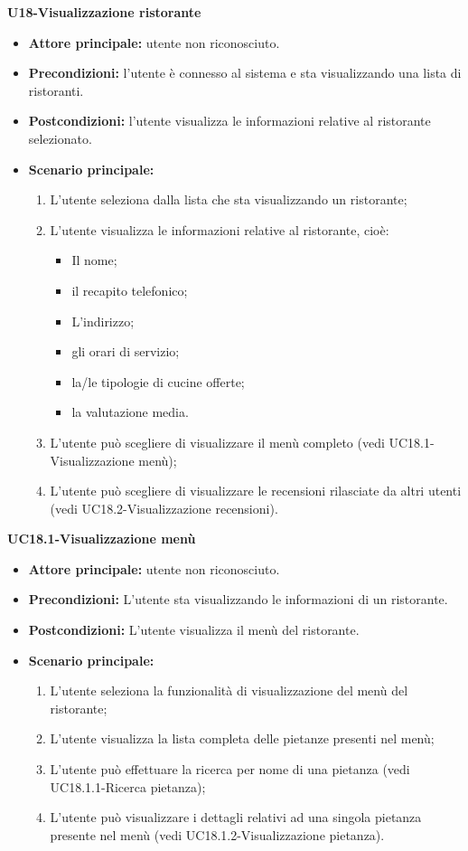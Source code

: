 \textbf{U18-Visualizzazione ristorante}
\begin{itemize}
\item \textbf{Attore principale:} utente non riconosciuto.
\item \textbf{Precondizioni:} l'utente è connesso al sistema e sta visualizzando una lista di ristoranti.
\item \textbf{Postcondizioni:} l'utente visualizza le informazioni relative al ristorante selezionato.
\item \textbf{Scenario principale:}
\begin{enumerate}
    \item L'utente seleziona dalla lista che sta visualizzando un ristorante;
    \item L'utente visualizza le informazioni relative al ristorante, cioè:
    \begin{itemize}
        \item Il nome;
        \item il recapito telefonico;
        \item L'indirizzo;
        \item gli orari di servizio;
        \item la/le tipologie di cucine offerte;
        \item la valutazione media.
    \end{itemize}
    \item L'utente può scegliere di visualizzare il menù completo (vedi UC18.1-Visualizzazione menù);
    \item L'utente può scegliere di visualizzare le recensioni rilasciate da altri utenti (vedi UC18.2-Visualizzazione recensioni).
\end{enumerate}
\end{itemize}

\textbf{UC18.1-Visualizzazione menù}
\begin{itemize}
\item \textbf{Attore principale:} utente non riconosciuto.
\item \textbf{Precondizioni:} L'utente sta visualizzando le informazioni di un ristorante.
\item \textbf{Postcondizioni:} L'utente visualizza il menù del ristorante.
\item \textbf{Scenario principale:}
\begin{enumerate}
    \item L'utente seleziona la funzionalità di visualizzazione del menù del ristorante;
    \item L'utente visualizza la lista completa delle pietanze presenti nel menù;
    \item L'utente può effettuare la ricerca per nome di una pietanza (vedi UC18.1.1-Ricerca pietanza);
    \item L'utente può visualizzare i dettagli relativi ad una singola pietanza presente
     nel menù (vedi UC18.1.2-Visualizzazione pietanza).
\end{enumerate}
\end{itemize}

